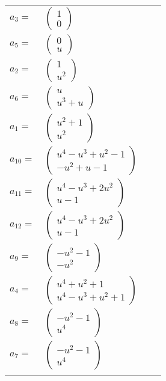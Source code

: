 \documentclass[1p]{elsarticle_modified}
\theoremstyle{definition}
\begin{document}
\begin{tabular}{m{7pt} m{180pt} m{7pt} m{180pt} }
\flushright $a_{3}=$&$\begin{pmatrix}1\\0\end{pmatrix}$ \\
\flushright $a_{5}=$&$\begin{pmatrix}0\\u\end{pmatrix}$ \\
\flushright $a_{2}=$&$\begin{pmatrix}1\\u^2\end{pmatrix}$ \\
\flushright $a_{6}=$&$\begin{pmatrix}u\\u^3+u\end{pmatrix}$ \\
\flushright $a_{1}=$&$\begin{pmatrix}u^2+1\\u^2\end{pmatrix}$ \\
\flushright $a_{10}=$&$\begin{pmatrix}u^4- u^3+u^2-1\\- u^2+u-1\end{pmatrix}$ \\
\flushright $a_{11}=$&$\begin{pmatrix}u^4- u^3+2 u^2\\u-1\end{pmatrix}$ \\
\flushright $a_{12}=$&$\begin{pmatrix}u^4- u^3+2 u^2\\u-1\end{pmatrix}$ \\
\flushright $a_{9}=$&$\begin{pmatrix}- u^2-1\\- u^2\end{pmatrix}$ \\
\flushright $a_{4}=$&$\begin{pmatrix}u^4+u^2+1\\u^4- u^3+u^2+1\end{pmatrix}$ \\
\flushright $a_{8}=$&$\begin{pmatrix}- u^2-1\\u^4\end{pmatrix}$ \\
\flushright $a_{7}=$&$\begin{pmatrix}- u^2-1\\u^4\end{pmatrix}$\\&\end{tabular}
\end{document}
